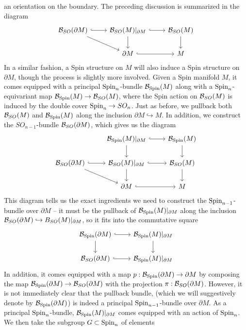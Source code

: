 an orientation on the boundary. The preceding discussion is summarized in
the diagram
\[\begin{tikzcd}
\B_{SO}(\partial M) \ar[r, hookrightarrow] \ar[dr] &
\B_{SO}(M)\vert_{\partial M} \ar[d] \ar[r, hookrightarrow] & \B_{SO}(M) \ar[d] \\
& \partial M \ar[r, hookrightarrow] & M
\end{tikzcd}\]
In a similar fashion, a Spin structure on $M$ will also induce a Spin structure
on $\partial M$, though the process is slightly more involved. Given a Spin
manifold $M$, it comes equipped with a principal $\mathrm{Spin}_n$-bundle $\mathcal{B}_{\mathrm{Spin}}(M)$
along with a $\mathrm{Spin}_n$-equivariant map $\mathcal{B}_{\mathrm{Spin}}(M) \to \mathcal{B}_{SO}(M)$, where
the Spin action on $\mathcal{B}_{SO}(M)$ is induced by the double cover $\mathrm{Spin}_n \to SO_n$.
Just as before, we pullback both $\mathcal{B}_{SO}(M)$ and $\mathcal{B}_{\mathrm{Spin}}(M)$ along
the inclusion $\partial M \hookrightarrow M$. In addition, we construct the
$SO_{n-1}$-bundle $\mathcal{B}_{SO}(\partial M)$, which gives us the diagram
\[\begin{tikzcd}
&\B_{\Spin}(M)\vert_{\partial M} \ar[r, hookrightarrow]\ar[d] & \B_{\Spin}(M) \ar[d] \\
\B_{SO}(\partial M) \ar[r, hookrightarrow] \ar[dr] &\B_{SO}(M)\vert_{\partial M}
\ar[d] \ar[r, hookrightarrow] & \B_{SO}(M) \ar[d] \\
&\partial M \ar[r, hookrightarrow] & M
\end{tikzcd}\]
This diagram tells us the exact ingredients we need to construct the
$\mathrm{Spin}_{n-1}$-bundle over $\partial M$ -- it must be the pullback of
$\mathcal{B}_{\mathrm{Spin}}(M)\vert_{\partial M}$ along the inclusion
$\mathcal{B}_{SO}(\partial M) \hookrightarrow B_{SO}(M)\vert_{\partial M}$, so it fits
into the commutative square
\[\begin{tikzcd}
\B_{\Spin}(\partial M) \ar[d] \ar[r, hookrightarrow] &
\B_{\Spin}(M)\vert_{\partial M}\ar[d] \\
\B_{SO}(\partial M) \ar[r, hookrightarrow] & \B_{\Spin}(M)\vert_{\partial M}
\end{tikzcd}\]
In addition, it comes equipped with a map $p : \mathcal{B}_{\mathrm{Spin}}(\partial M) \to \partial M$
by composing the map $\mathcal{B}_{\mathrm{Spin}}(\partial M) \to \mathcal{B}_{SO}(\partial M)$ with the projection
$\pi : \mathcal{B}_{SO}(\partial M)$. However, it is not immediately clear that the pullback
bundle, (which we will suggestively denote by $\mathcal{B}_{\mathrm{Spin}}(\partial M)$) is
indeed a principal $\mathrm{Spin}_{n-1}$-bundle over $\partial M$. As a principal
$\mathrm{Spin}_n$-bundle, $\mathcal{B}_{\mathrm{Spin}}(M)\vert_{\partial M}$ comes equipped with an
action of $\mathrm{Spin}_n$. We then take the subgroup $G \subset \mathrm{Spin}_n$ of elements
